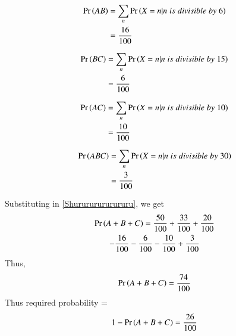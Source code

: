 \documentclass[journal,12pt,twocolumn]{IEEEtran}
\begin{document}
\begin{align}
    \Pr\left(AB\right) &= \sum_n\Pr\left(X = n|n\; is\; divisible\; by\; 6\right)\\
            &= \frac{16}{100}   
\end{align}

\begin{align}
    \Pr\left(BC\right) &= \sum_n\Pr\left(X = n|n\; is\; divisible\; by\; 15\right)\\
            &= \frac{6}{100}   
\end{align}

\begin{align}
    \Pr\left(AC\right) &= \sum_n\Pr\left(X = n|n\; is\; divisible\; by\; 10\right)\\
            &= \frac{10}{100}   
\end{align}

\begin{align}
    \Pr\left(ABC\right) &= \sum_n\Pr\left(X = n|n\; is\; divisible\; by\; 30\right)\\
            &= \frac{3}{100}   
\end{align}

Substituting in \eqref{Shurururururururu}, we get
\begin{multline}
    \Pr\left(A+B+C\right) = \frac{50}{100} + \frac{33}{100} + \frac{20}{100} \\- \frac{16}{100} - \frac{6}{100} - \frac{10}{100} + \frac{3}{100} 
\end{multline}
Thus, 
\begin{align}
    \Pr\left(A+B+C\right) = \frac{74}{100}
\end{align}
Thus required probability = 
\begin{align}
    1 - \Pr\left(A+B+C\right) = \frac{26}{100}
\end{align}
\end{document}
